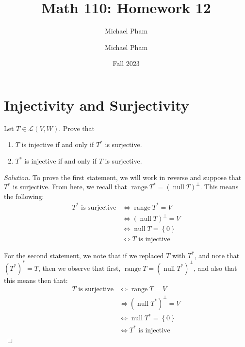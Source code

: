 \documentclass{article}
\title{#1}
\author{Michael Pham}
\date{#2}
\newenvironment{solution}{\begin{proof}[Solution]}{\end{proof}}
\DeclareMathOperator*{\vnull}{\mathrm{null}}
\DeclareMathOperator*{\vrange}{\mathrm{range}}
\newcommand{\mytitle}[2]{%
	\title{#1}
	\author{Michael Pham}
	\date{#2}
	\maketitle
	\newpage
	\tableofcontents
	\newpage
}
\begin{document}
\mytitle{Math 110: Homework 12}{Fall 2023}

\section{Injectivity and Surjectivity}
\begin{hw}
	Let $T \in \mathcal{L}(V,W)$. Prove that
	\begin{enumerate}
		\item $T$ is injective if and only if $T^{*}$ is surjective.
		\item $T^{*}$ is injective if and only if $T$ is surjective.
	\end{enumerate}
\end{hw}
\begin{solution}
	To prove the first statement, we will work in reverse and suppose that $T^{*}$ is surjective. From here, we recall that $\vrange T^{*} = (\vnull T)^{\perp}$. This means the following:
	\begin{align*}
		T^{*} \text{ is surjective} &\iff \vrange T^{*} = V \\
		&\iff (\vnull T)^{\perp} = V \\
		&\iff \vnull T = \left\{  0 \right\} \\
		&\iff T \text{ is injective}
	\end{align*}

	For the second statement, we note that if we replaced $T$ with $T^{*}$, and note that $(T^{*})^{*} = T$, then we observe that first, $\vrange T = (\vnull T^{*})^{\perp}$, and also that this means then that:
	\begin{align*}
		T \text{ is surjective} &\iff \vrange T = V \\
		&\iff (\vnull T^{*})^{\perp} = V \\
		&\iff \vnull T^{*} = \left\{  0 \right\} \\
		&\iff T^{*} \text{ is injective}
	\end{align*}
\end{solution}

\newpage
\end{document}
